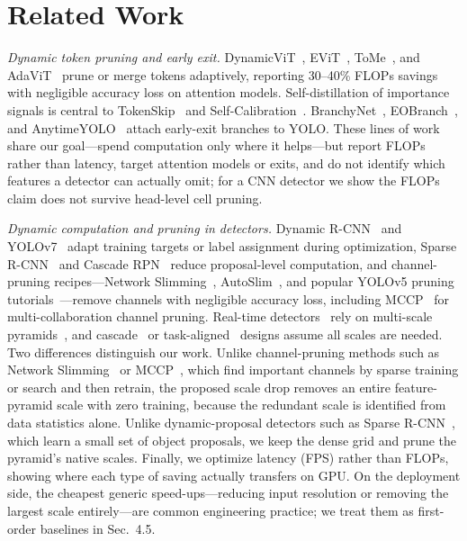 \documentclass[a4paper,fleqn]{cas-dc}
\begin{document}
\section{Related Work}\label{sec:related}
\emph{Dynamic token pruning and early exit.} DynamicViT~\cite{rao2021dynamicvit}, EViT~\cite{liang2022evit}, ToMe~\cite{bolya2023tome}, and AdaViT~\cite{meng2021adavit} prune or merge tokens adaptively, reporting 30--40\% FLOPs savings with negligible accuracy loss on attention models. Self-distillation of importance signals is central to TokenSkip~\cite{xia2025tokenskip} and Self-Calibration~\cite{huang2025selfcalib}. BranchyNet~\cite{teerapittayanon2016branchynet}, EOBranch~\cite{scholte2025eobranch}, and AnytimeYOLO~\cite{anytimeyolo2025} attach early-exit branches to YOLO. These lines of work share our goal---spend computation only where it helps---but report FLOPs rather than latency, target attention models or exits, and do not identify which features a detector can actually omit; for a CNN detector we show the FLOPs claim does not survive head-level cell pruning.

\emph{Dynamic computation and pruning in detectors.} Dynamic R-CNN~\cite{zhang2020dynamicrcnn} and YOLOv7~\cite{wang2023yolov7} adapt training targets or label assignment during optimization, Sparse R-CNN~\cite{sun2021sparsercnn} and Cascade RPN~\cite{vu2019cascaderpn} reduce proposal-level computation, and channel-pruning recipes---Network Slimming~\cite{liu2017networkslimming}, AutoSlim~\cite{yu2020autoslim}, and popular YOLOv5 pruning tutorials~\cite{ultralytics2023yolov5}---remove channels with negligible accuracy loss, including MCCP~\cite{yan2023mccp} for multi-collaboration channel pruning. Real-time detectors~\cite{redmon2016yolo,tian2019fcos,lin2017focal,jocher2026ultralyticsyolo26unifiedrealtime} rely on multi-scale pyramids~\cite{lin2017fpn}, and cascade~\cite{cai2018cascade} or task-aligned~\cite{feng2021tood} designs assume all scales are needed. Two differences distinguish our work. Unlike channel-pruning methods such as Network Slimming~\cite{liu2017networkslimming} or MCCP~\cite{yan2023mccp}, which find important channels by sparse training or search and then retrain, the proposed scale drop removes an entire feature-pyramid scale with zero training, because the redundant scale is identified from data statistics alone. Unlike dynamic-proposal detectors such as Sparse R-CNN~\cite{sun2021sparsercnn}, which learn a small set of object proposals, we keep the dense grid and prune the pyramid's native scales. Finally, we optimize latency (FPS) rather than FLOPs, showing where each type of saving actually transfers on GPU. On the deployment side, the cheapest generic speed-ups---reducing input resolution or removing the largest scale entirely---are common engineering practice; we treat them as first-order baselines in Sec.~4.5.
\end{document}
